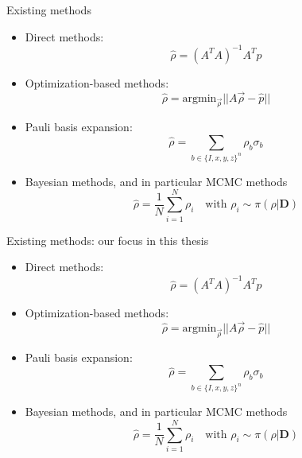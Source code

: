 \documentclass{beamer}
\newcommand{\mb}{\mathbf}
\newcommand{\semitransp}[2][35]{\textcolor{fg!#1}{#2}}
\begin{document}
\begin{frame}{Existing methods}
    \begin{itemize}
        \item Direct methods: \begin{equation}
            \hat \rho = (A^TA)^{-1}A^T \hat p
        \end{equation}
        \item Optimization-based methods: \begin{equation}
            \hat \rho = \text{argmin}_{\vec\rho} ||A \vec\rho - \hat p||
        \end{equation} 
        \item Pauli basis expansion:\begin{equation}
            \hat \rho = \sum_{b\in\{I,x,y,z\}^n} \rho_b \sigma_b
        \end{equation}
        \item Bayesian methods, and in particular MCMC methods
        \begin{equation}
        \hat \rho = \frac{1}{N}\sum_{i=1}^N \rho_i \quad \text{with } \rho_i \sim \pi(\rho|\mb D)
        \end{equation}
    \end{itemize}
\end{frame}
\begin{frame}{Existing methods: our focus in this thesis}
    \begin{itemize}
        \item<0> Direct methods: \begin{equation}
            \hat \rho = (A^TA)^{-1}A^T \hat p
        \end{equation}
        \item<0> Optimization-based methods: \begin{equation}
            \hat \rho = \text{argmin}_{\vec\rho} ||A \vec\rho - \hat p||
        \end{equation} 
        \item<0> Pauli basis expansion:
        \begin{equation}
            \hat \rho = \sum_{b\in\{I,x,y,z\}^n} \rho_b \sigma_b
        \end{equation}
        \item<1> Bayesian methods, and in particular MCMC methods
        \begin{equation}
        \hat \rho = \frac{1}{N}\sum_{i=1}^N \rho_i \quad \text{with } \rho_i \sim \pi(\rho|\mb D)
        \end{equation}
    \end{itemize}
\end{frame}
\end{document}

